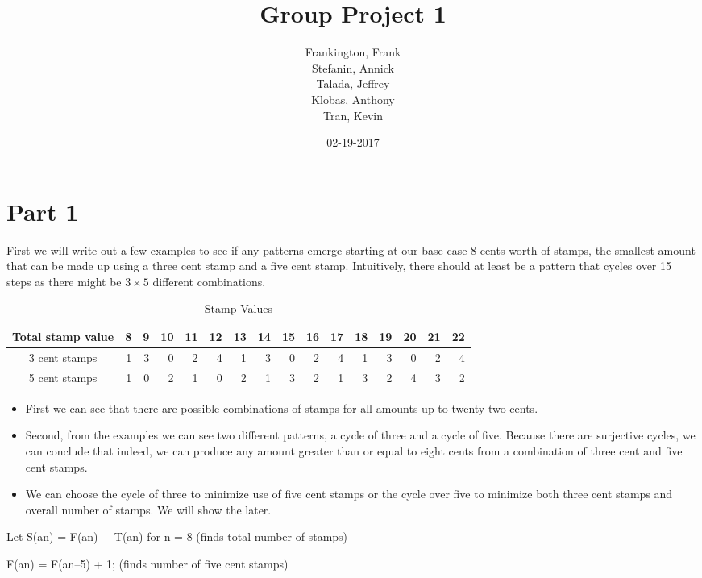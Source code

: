 \documentclass{article}
\title{Group Project 1}
\date{02-19-2017}
\author{Frankington, Frank\\Stefanin, Annick\\Talada, Jeffrey\\Klobas, Anthony\\ Tran, Kevin\\  }
\begin{document}
\maketitle
\newpage
{}

\section{Part 1}
First we will write out a few examples to see if any patterns emerge starting at our base case 8 cents worth of stamps, the smallest amount that can be made up using a three cent stamp and a five cent stamp. Intuitively, there should at least be a pattern that cycles over 15 steps as there might be $3×5$ different combinations.

\begin{table}[h]
	\caption{Stamp Values}
	\centering
	\begin{tabular}{c rrrrrrrrrrrrrrr}
		\hline\hline
		Total stamp value & 8 & 9 & 10 & 11 & 12 & 13 & 14 & 15 & 16 & 17 & 18 & 19 & 20 & 21 & 22 \\[0.5ex]
	\hline
	3 cent stamps & 1 & 3 & 0 & 2 & 4 & 1 & 3 & 0 & 2 & 4 & 1 & 3 & 0 & 2 & 4\\
	5 cent stamps & 1 & 0 & 2 & 1 & 0 & 2 & 1 & 3 & 2 & 1 & 3 & 2 & 4 & 3 & 2\\ [1ex] %
	\hline
\end{tabular}
\label{tab:hresult}
\end{table}

\begin{itemize}
	\item First we can see that there are possible combinations of stamps for all amounts up to twenty-two cents.
	\item Second, from the examples we can see two different patterns, a cycle of three and a cycle of five. Because there are surjective cycles, we can conclude that indeed, we can produce any amount greater than or equal to eight cents from a combination of three cent and five cent stamps.
	\item We can choose the cycle of three to minimize use of five cent stamps or the cycle over five to minimize both three cent stamps and overall number of stamps. We will show the later.
\end{itemize}

\noindent Let S(an) = F(an) + T(an) for n = 8  (finds total number of stamps)

\noindent F(an) = F(an–5) + 1; (finds number of five cent stamps)
\end{document}
